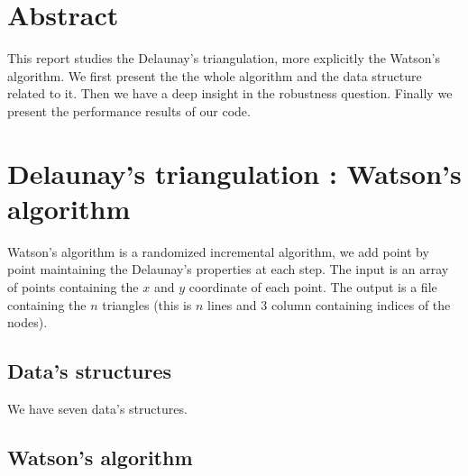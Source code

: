 \section*{Abstract}
This report studies the Delaunay's triangulation, more explicitly the Watson's algorithm. We first present the the whole algorithm and the data structure related to it. Then we have a deep insight in the robustness question. Finally we present the performance results of our code. 


\section{Delaunay's triangulation : Watson's algorithm}
Watson's algorithm \cite{de2000computational} is a randomized incremental algorithm, we add point by point maintaining the Delaunay's properties at each step. The input is an array of points containing the $x$ and $y$ coordinate of each point. The output is a file containing the $n$ triangles (this is $n$ lines and $3$ column containing indices of the nodes).

\subsection*{Data's structures}
We have seven data's structures.

\subsection*{Watson's algorithm}

